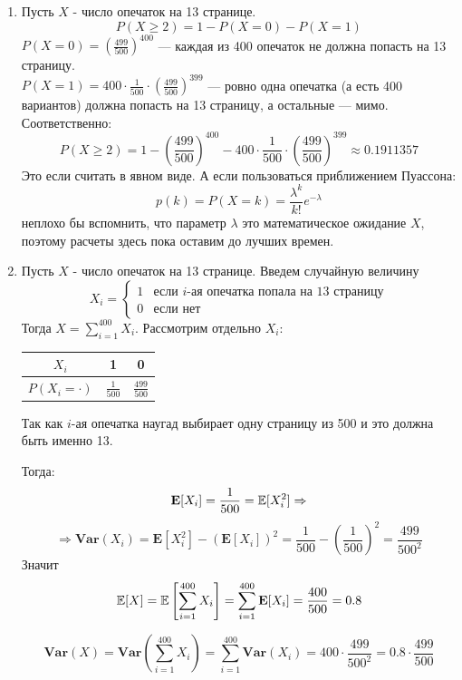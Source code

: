 \documentclass[12pt, a4paper]{article}\usepackage[]{graphicx}\usepackage[]{color}
\begin{document}
\begin{enumerate}
\begin{enumerate}
\item Пусть $X$ - число опечаток на 13 странице. \[P(X \geqslant 2) = 1 - P(X=0) - P(X=1) \]
$P(X=0) = \left( \frac{499}{500} \right)^{400}$ — каждая из 400 опечаток не должна попасть на 13 страницу.\\
$P(X=1) = 400\cdot\frac{1}{500}\cdot\left( \frac{499}{500} \right)^{399}$ — ровно одна опечатка (а есть 400 вариантов) должна попасть на 13 страницу, а остальные — мимо. Соответственно:
\[
P(X \geqslant 2) = 1 - \left( \frac{499}{500} \right)^{400} - 400\cdot\frac{1}{500}\cdot\left( \frac{499}{500} \right)^{399} \approx 0.1911357
\]
Это если считать в явном виде. А если пользоваться приближением Пуассона:
\[
p(k) = P(X = k) = \frac{\lambda^k}{k!}e^{-\lambda}
\]
неплохо бы вспомнить, что параметр $\lambda$ это математическое ожидание $X$, поэтому расчеты здесь пока оставим до лучших времен.

\item Пусть $X$ - число опечаток на 13 странице. Введем случайную величину
\[X_i =
\begin{cases}
1 & \text{если } i\text{-ая опечатка попала на 13 страницу}\\
0 & \text{если нет}
\end{cases}
\]
Тогда $X = \sum\limits_{i=1}^{400}X_i$. Рассмотрим отдельно $X_i$: \hspace{0.5cm}
\begin{minipage}{0.3\linewidth}

\begin{tabular}{c|c|c}
$X_i$ & 1 & 0 \\
\hline
$P(X_i = \cdot)$ & $\frac{1}{500} $ & $\frac{499}{500}$
\end{tabular}
\end{minipage}


Так как $i$-ая опечатка наугад выбирает одну страницу из 500 и это должна быть именно 13.

Тогда:
\[
\mathbf{E}[X_i] = \frac{1}{500} = \mathbb{E}[X^2_i] \Rightarrow
\]
\[
\Rightarrow \mathbf{Var}(X_i) = \mathbf{E}[X^2_i] - (\mathbf{E}[X_i])^2 = \frac{1}{500} - \left(\frac{1}{500}\right)^2 = \frac{499}{500^2}
\]
Значит
\[
\mathbb{E}[X] = \mathbb{E}\left[\sum\limits_{i=1}^{400}X_i\right] = \sum\limits_{i=1}^{400}\mathbf{E}[X_i]  = \frac{400}{500} = 0.8
\]

\[
\mathbf{Var}(X) = \mathbf{Var}\left(\sum\limits_{i=1}^{400}X_i\right) = \sum\limits_{i=1}^{400}\mathbf{Var}(X_i) = 400\cdot\frac{499}{500^2} = 0.8\cdot\frac{499}{500}
\]


\end{enumerate}
\end{enumerate}
\end{document}
